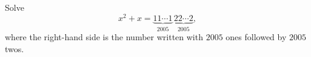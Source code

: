 Solve
\[x^2+x=\underbrace{11\cdots1}_{2005}\,\underbrace{22\cdots2}_{2005},\]
where the right-hand side is the number written with $2005$ ones followed by $2005$ twos.
